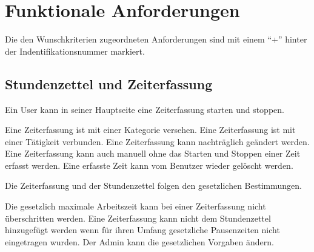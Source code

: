\section{Funktionale Anforderungen}

Die den Wunschkriterien zugeordneten Anforderungen sind mit einem "`+"' hinter der Indentifikationsnummer markiert.

\subsection{Stundenzettel und Zeiterfassung}

\begin{requirements}
    Ein User kann in seiner Hauptseite eine Zeiterfassung starten und stoppen.
    \begin{requirements}
         Eine Zeiterfassung ist mit einer Kategorie versehen.
         Eine Zeiterfassung ist mit einer Tätigkeit verbunden.
         Eine Zeiterfassung kann nachträglich geändert werden.
         Eine Zeiterfassung kann auch manuell ohne das Starten und Stoppen einer Zeit erfasst werden.
         Eine erfasste Zeit kann vom Benutzer wieder gelöscht werden.
    \end{requirements}

    Die Zeiterfassung und der Stundenzettel folgen den gesetzlichen Bestimmungen.
    \begin{requirements}
         Die gesetzlich maximale Arbeitszeit kann bei einer Zeiterfassung nicht überschritten werden.
         Eine Zeiterfassung kann nicht dem Stundenzettel hinzugefügt werden wenn für ihren Umfang gesetzliche Pausenzeiten nicht eingetragen wurden.
         Der Admin kann die gesetzlichen Vorgaben ändern.
    \end{requirements}


\end{requirements}
